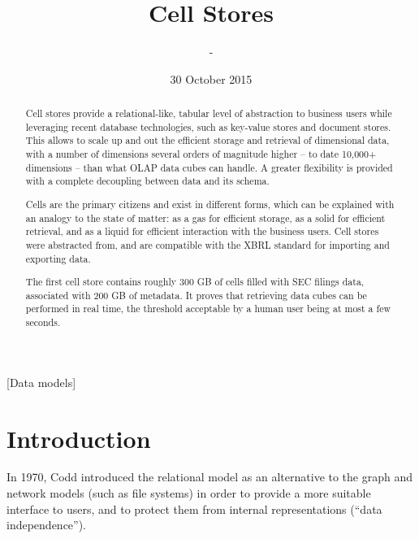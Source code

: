 \documentclass{acm_proc_article-sp}
\begin{document}
\title{Cell Stores}


\author{
\alignauthor
-
}
\date{30 October 2015}
\maketitle

\begin{abstract}
Cell stores provide a relational-like, tabular level of abstraction to business users while leveraging recent database technologies, such as key-value stores and document stores. This allows to scale up and out the efficient storage and retrieval of dimensional data, with a number of dimensions several orders of magnitude higher -- to date 10,000+ dimensions -- than what OLAP data cubes can handle. A greater flexibility is provided with a complete decoupling between data and its schema.

Cells are the primary citizens and exist in different forms, which can be explained with an analogy to the state of matter: as a gas for efficient storage, as a solid for efficient retrieval, and as a liquid for efficient interaction with the business users. Cell stores were abstracted from, and are compatible with the XBRL standard for importing and exporting data.

The first cell store contains roughly 300 GB of cells filled with SEC filings data, associated with 200 GB of metadata. It proves that retrieving data cubes can be performed in real time, the threshold acceptable by a human user being at most a few seconds.
\end{abstract}

[Data models]



\section{Introduction}
In 1970, Codd \cite{Codd1970} introduced the relational model as an alternative to the graph and network models (such as file systems) in order to provide a more suitable interface to users, and to protect them from internal representations (``data independence'').
\end{document}
